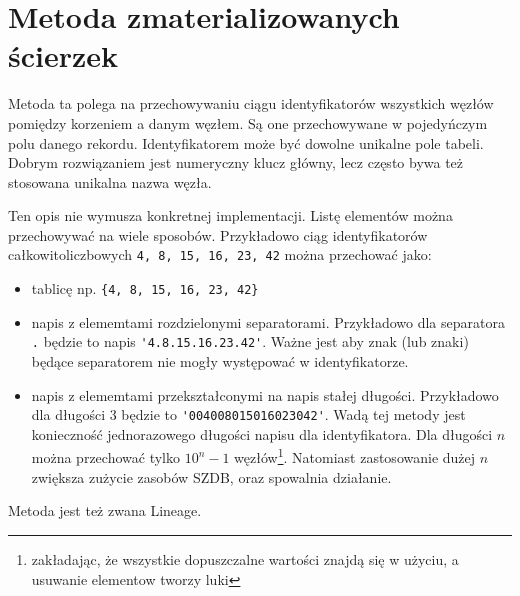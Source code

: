\section{Metoda zmaterializowanych ścierzek}

Metoda ta polega na przechowywaniu ciągu identyfikatorów wszystkich węzłów pomiędzy korzeniem a danym węzłem.
Są one przechowywane w pojedyńczym polu danego rekordu. 
Identyfikatorem może być dowolne unikalne pole tabeli.
Dobrym rozwiązaniem jest numeryczny klucz główny, lecz często bywa też stosowana unikalna nazwa węzła.


Ten opis nie wymusza konkretnej implementacji. 
Listę elementów można przechowywać na wiele sposobów. 
Przykładowo ciąg identyfikatorów całkowitoliczbowych \texttt{4, 8, 15, 16, 23, 42} można przechować jako:
\begin{itemize}
 \item tablicę np. \verb|{4, 8, 15, 16, 23, 42}|
 \item napis z elememtami rozdzielonymi separatorami. 
    Przykładowo dla separatora \verb|.| będzie to napis \verb|'4.8.15.16.23.42'|. 
    Ważne jest aby znak (lub znaki) będące separatorem nie mogły występować w identyfikatorze.
 \item napis z elememtami przekształconymi na napis stałej długości. 
    Przykładowo dla długości 3 będzie to \verb|'004008015016023042'|. 
    Wadą tej metody jest konieczność jednorazowego długości napisu dla identyfikatora.
    Dla długości $n$ można przechować tylko $10^n-1$ węzłów\footnote{zakładając, że wszystkie dopuszczalne wartości znajdą się w użyciu, a usuwanie elementow tworzy luki}.
    Natomiast zastosowanie dużej $n$ zwiększa zużycie zasobów SZDB, oraz spowalnia działanie.
\end{itemize}


Metoda jest też zwana Lineage.







